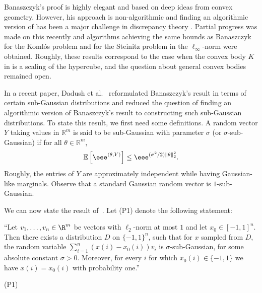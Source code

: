 \documentclass{toc}
\newcommand\E{\mathbb{E}}
\begin{document}
Banaszczyk's proof is highly elegant and based on deep ideas from convex geometry. However, his approach is non-algorithmic and finding an algorithmic version of  has been a major challenge in discrepancy
theory  %
\cite{Rot14, Sashothesis, DGLN16}. Partial progress was made on this recently  \cite{BDG16, BG17,harish17} and algorithms achieving the same bounds as Banaszczyk for the Koml\'{o}s problem and for the Steinitz problem in the $\ell_\infty$-norm were obtained. Roughly, these results correspond to the case when the convex body $K$ in  is a scaling of the hypercube, and the question about general convex bodies remained open.

In a recent
%
paper,     %
Dadush et al.~\cite{DGLN16} reformulated Banaszczyk's result in
terms of
certain sub-Gaussian distributions and reduced the question of finding an
algorithmic version of Banaszczyk's result to constructing such sub-Gaussian
distributions. To state this result, we first need some definitions. A random
vector $Y$ taking values in $\mathbb{R}^m$ is said to be sub-Gaussian with
parameter $\sigma$ (or $\sigma$-sub-Gaussian) if for all $\theta\in \mathbb{R}^{m}$,
\[
  \E\left[ \eee^{\langle \theta,Y\rangle }  \right] \le  \eee^{(\sigma^2/2)\| \theta \|_2^2}.
\]
Roughly, the entries of $Y$ are approximately independent while having Gaussian-like marginals.
Observe that a standard Gaussian random vector is $1$-sub-Gaussian.


We can now state the result
%
of~\cite{DGLN16}.
Let (P1) denote the following statement: \\

\begin{minipage}{35em}
%
\flushleft
``Let $v_1,\ldots,v_n \in \R^m$ be vectors with $\ell_2$-norm at most $1$ and let
$x_0\in[-1,1]^n$. Then there exists a distribution $D$ on $\{-1,1\}^n$,
such that for $x$ sampled from $D$, the random variable $\sum_{i=1}^n (x(i)-x_0(i)) v_i$ is
$\sigma$-sub-Gaussian, for some absolute constant $\sigma>0$.
Moreover, for every $i$ for which $x_0(i) \in \{-1,1\}$ we have $x(i)=x_0(i)$ with probability one.''\\
\end{minipage}
\begin{minipage}{4em}
\flushright
(P1)\\
\end{minipage}

\bigskip
\end{document}
